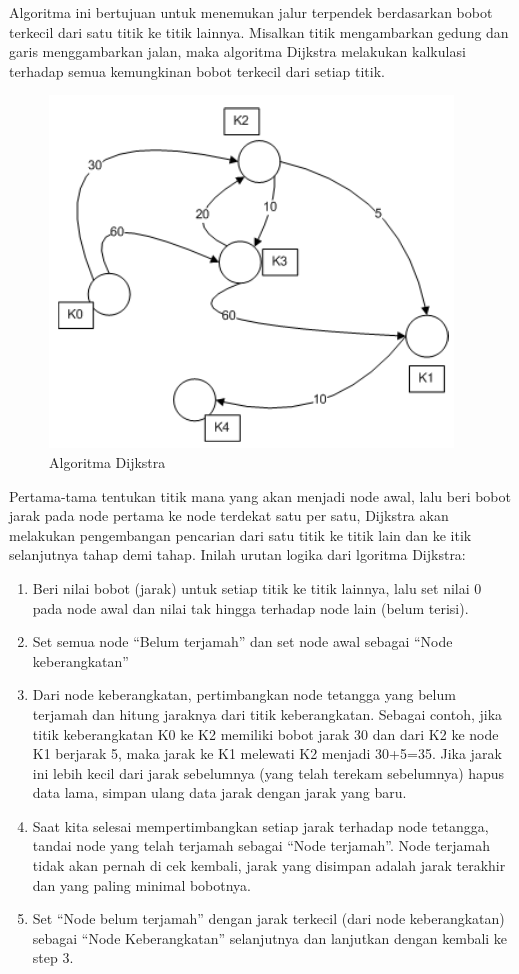 Algoritma ini bertujuan untuk menemukan jalur
terpendek berdasarkan bobot terkecil dari satu titik ke titik
lainnya. Misalkan titik mengambarkan gedung dan garis
menggambarkan jalan, maka algoritma Dijkstra melakukan
kalkulasi terhadap semua kemungkinan bobot terkecil dari
setiap titik.

\begin{figure}[h]
\centering
\includegraphics[scale=0.5]{figures/Algoritma_Dijkstra.PNG}
\caption{Algoritma Dijkstra}
\label{gambar2_9}
\end{figure}

Pertama-tama tentukan titik mana yang akan menjadi node awal, lalu beri bobot jarak pada node pertama ke node terdekat satu per satu, Dijkstra akan melakukan pengembangan pencarian dari satu titik ke titik lain dan ke itik selanjutnya tahap demi tahap. Inilah urutan logika dari lgoritma Dijkstra:
\begin{enumerate}
    \item Beri nilai bobot (jarak) untuk setiap titik ke titik
lainnya, lalu set nilai 0 pada node awal dan nilai tak
hingga terhadap node lain (belum terisi).
    \item Set semua node “Belum terjamah” dan set node awal
sebagai “Node keberangkatan”
    \item Dari node keberangkatan, pertimbangkan node
tetangga yang belum terjamah dan hitung jaraknya
dari titik keberangkatan. Sebagai contoh, jika titik keberangkatan K0 ke K2 memiliki bobot jarak 30 dan dari
K2 ke node K1 berjarak 5, maka jarak ke K1 melewati K2
menjadi 30+5=35. Jika jarak ini lebih kecil dari jarak
sebelumnya (yang telah terekam sebelumnya) hapus
data lama, simpan ulang data jarak dengan jarak yang
baru.
    \item Saat kita selesai mempertimbangkan setiap jarak
terhadap node tetangga, tandai node yang telah
terjamah sebagai “Node terjamah”. Node terjamah
tidak akan pernah di cek kembali, jarak yang disimpan
adalah jarak terakhir dan yang paling minimal
bobotnya.
    \item Set “Node belum terjamah” dengan jarak terkecil (dari
node keberangkatan) sebagai “Node Keberangkatan”
selanjutnya dan lanjutkan dengan kembali ke step 3.
\end{enumerate}


